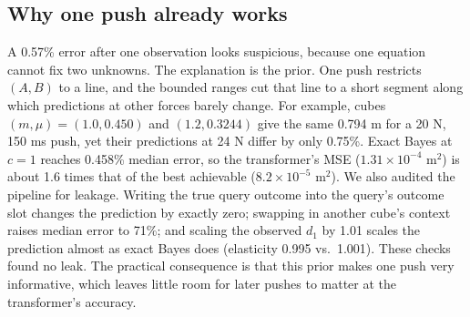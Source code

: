 \documentclass{article}
\begin{document}
\subsection{Why one push already works}\label{sec:onepush}
A 0.57\% error after one observation looks suspicious, because one equation cannot fix two unknowns. The explanation is the prior. One push restricts $(A,B)$ to a line, and the bounded ranges cut that line to a short segment along which predictions at other forces barely change. For example, cubes $(m,\mu)=(1.0, 0.450)$ and $(1.2, 0.3244)$ give the same 0.794 m for a 20 N, 150 ms push, yet their predictions at 24 N differ by only 0.75\%. Exact Bayes at $c=1$ reaches 0.458\% median error, so the transformer's MSE ($1.31\times10^{-4}$ m$^2$) is about 1.6 times that of the best achievable ($8.2\times10^{-5}$ m$^2$). We also audited the pipeline for leakage. Writing the true query outcome into the query's outcome slot changes the prediction by exactly zero; swapping in another cube's context raises median error to 71\%; and scaling the observed $d_1$ by 1.01 scales the prediction almost as exact Bayes does (elasticity 0.995 vs.\ 1.001). These checks found no leak. The practical consequence is that this prior makes one push very informative, which leaves little room for later pushes to matter at the transformer's accuracy.
\end{document}
